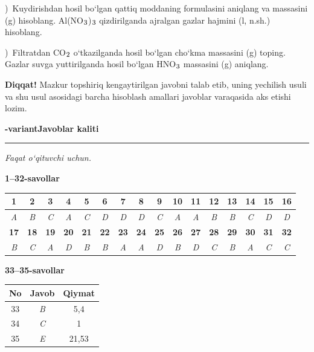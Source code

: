 \documentclass[11pt,a4paper]{article}
\renewcommand{\textsubscript}[1]{\ensuremath{_{\text{\fontsize{8}{8}\selectfont #1}}}}
\newcommand{\qsep}{\par\vspace{13pt}}
\newcommand{\diqqat}[1]{\par\smallskip\noindent\textbf{Diqqat!} #1\par\medskip}
\begin{document}
)\ Kuydirishdan hosil bo`lgan qattiq moddaning formulasini aniqlang va massasini (g) hisoblang. Al(NO\textsubscript{3})\textsubscript{3} qizdirilganda ajralgan gazlar hajmini (l, n.sh.) hisoblang.\par
{})\ Filtratdan CO\textsubscript{2} o`tkazilganda hosil bo`lgan cho`kma massasini (g) toping. Gazlar suvga yuttirilganda hosil bo`lgan HNO\textsubscript{3} massasini (g) aniqlang.\par
\diqqat{Mazkur topshiriq kengaytirilgan javobni talab etib, uning yechilish usuli va shu usul asosidagi barcha hisoblash amallari javoblar varaqasida aks etishi lozim.}\qsep
\newpage
\noindent\textbf{\fontsize{13}{15}-variant}\hfill \textbf{Javoblar kaliti}\par\smallskip\hrule\smallskip
\textit{Faqat o`qituvchi uchun.}\par\medskip
\noindent\textbf{1--32-savollar}\par\smallskip
\noindent\begin{tabular}{|c|c|c|c|c|c|c|c|c|c|c|c|c|c|c|c|}\hline
\textbf{1} & \textbf{2} & \textbf{3} & \textbf{4} & \textbf{5} & \textbf{6} & \textbf{7} & \textbf{8} & \textbf{9} & \textbf{10} & \textbf{11} & \textbf{12} & \textbf{13} & \textbf{14} & \textbf{15} & \textbf{16}\\\hline
\textsl{A} & \textsl{B} & \textsl{C} & \textsl{A} & \textsl{C} & \textsl{D} & \textsl{D} & \textsl{D} & \textsl{C} & \textsl{A} & \textsl{A} & \textsl{B} & \textsl{B} & \textsl{C} & \textsl{D} & \textsl{D}\\\hline
\textbf{17} & \textbf{18} & \textbf{19} & \textbf{20} & \textbf{21} & \textbf{22} & \textbf{23} & \textbf{24} & \textbf{25} & \textbf{26} & \textbf{27} & \textbf{28} & \textbf{29} & \textbf{30} & \textbf{31} & \textbf{32}\\\hline
\textsl{B} & \textsl{C} & \textsl{A} & \textsl{D} & \textsl{B} & \textsl{B} & \textsl{A} & \textsl{A} & \textsl{D} & \textsl{B} & \textsl{D} & \textsl{C} & \textsl{B} & \textsl{A} & \textsl{C} & \textsl{C}\\\hline
\end{tabular}\par\medskip
\noindent\textbf{33--35-savollar}\par\smallskip
\noindent\begin{tabular}{|c|c|c|}\hline \textbf{No} & \textbf{Javob} & \textbf{Qiymat}\\\hline
33 & \textsl{B} & 5,4\\\hline
34 & \textsl{C} & 1\\\hline
35 & \textsl{E} & 21,53\\\hline
\end{tabular}\par\medskip
\end{document}
